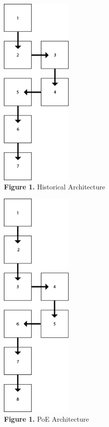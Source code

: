 \documentclass{article}
\begin{document}
\begin{multicols}{2}
\begin{center}
\includegraphics[width=100pt] {archHist.png}\\
\vfill
\textbf{Figure 1.}  Historical Architecture
\end{center}

\columnbreak

\begin{center}
\includegraphics[width=100pt] {archPoE.png}\\
\vfill
\textbf{Figure 1.} PoE Architecture
\end{center}

\end{multicols}
\end{document}
